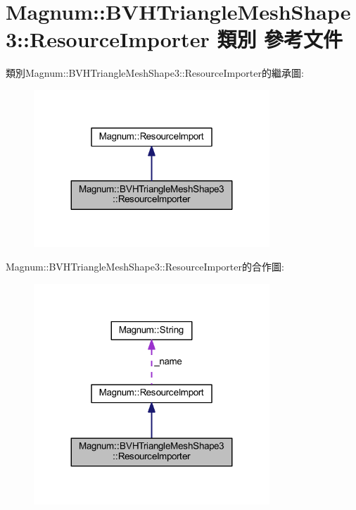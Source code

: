 \hypertarget{class_magnum_1_1_b_v_h_triangle_mesh_shape3_1_1_resource_importer}{}\section{Magnum\+:\+:B\+V\+H\+Triangle\+Mesh\+Shape3\+:\+:Resource\+Importer 類別 參考文件}
\label{class_magnum_1_1_b_v_h_triangle_mesh_shape3_1_1_resource_importer}


類別\+Magnum\+:\+:B\+V\+H\+Triangle\+Mesh\+Shape3\+:\+:Resource\+Importer的繼承圖\+:\nopagebreak
\begin{figure}[H]
\begin{center}
\leavevmode
\includegraphics[width=251pt]{class_magnum_1_1_b_v_h_triangle_mesh_shape3_1_1_resource_importer__inherit__graph}
\end{center}
\end{figure}


Magnum\+:\+:B\+V\+H\+Triangle\+Mesh\+Shape3\+:\+:Resource\+Importer的合作圖\+:\nopagebreak
\begin{figure}[H]
\begin{center}
\leavevmode
\includegraphics[width=251pt]{class_magnum_1_1_b_v_h_triangle_mesh_shape3_1_1_resource_importer__coll__graph}
\end{center}
\end{figure}
